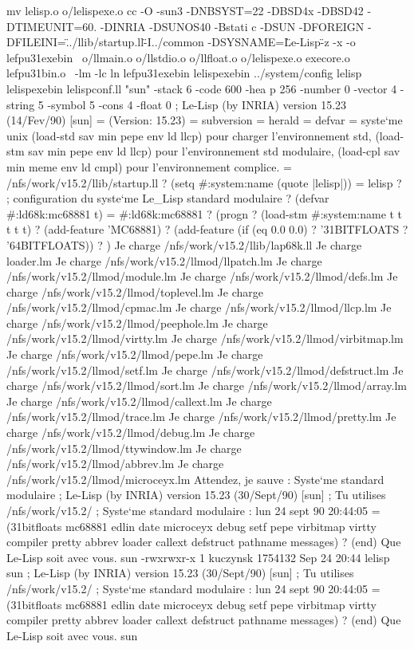 mv lelisp.o o/lelispexe.o
cc -O -sun3 -DNBSYST=22 -DBSD4x -DBSD42 -DTIMEUNIT=60. -DINRIA -DSUNOS40 -Bstati
c  -DSUN    -DFOREIGN  -DFILEINI=\"../llib/startup.ll\" -I../common -DSYSNAME=\"
Le-Lisp\" -z -x -o lefpu31exebin \
o/llmain.o o/llstdio.o o/llfloat.o  o/lelispexe.o execore.o  lefpu31bin.o \
-lm -lc
ln lefpu31exebin lelispexebin
../system/config lelisp lelispexebin lelispconf.ll "sun" -stack 6 -code 600 -hea
p 256 -number 0  -vector 4 -string 5 -symbol 5 -cons 4 -float 0
; Le-Lisp (by INRIA) version 15.23  (14/Fev/90)  [sun]
= (Version:  15.23)
= subversion
= herald
= defvar
= syste`me unix
 (load-std sav min pepe env ld llcp)  pour charger l'environnement std,
 (load-stm sav min pepe env ld llcp)  pour l'environnement std modulaire,
 (load-cpl sav min meme env ld cmpl)  pour l'environnement complice.
= /nfs/work/v15.2/llib/startup.ll
? (setq #:system:name (quote |lelisp|))
= lelisp
? ; configuration du syste`me Le_Lisp standard modulaire
? (defvar #:ld68k:mc68881 t)
= #:ld68k:mc68881
? (progn
?   (load-stm #:system:name t t t t t)
?   (add-feature 'MC68881)
?   (add-feature (if (eq 0.0 0.0)
?                  '31BITFLOATS
?                  '64BITFLOATS))
?   )
Je charge /nfs/work/v15.2/llib/lap68k.ll
Je charge loader.lm
Je charge /nfs/work/v15.2/llmod/llpatch.lm
Je charge /nfs/work/v15.2/llmod/module.lm
Je charge /nfs/work/v15.2/llmod/defs.lm
Je charge /nfs/work/v15.2/llmod/toplevel.lm
Je charge /nfs/work/v15.2/llmod/cpmac.lm
Je charge /nfs/work/v15.2/llmod/llcp.lm
Je charge /nfs/work/v15.2/llmod/peephole.lm
Je charge /nfs/work/v15.2/llmod/virtty.lm
Je charge /nfs/work/v15.2/llmod/virbitmap.lm
Je charge /nfs/work/v15.2/llmod/pepe.lm
Je charge /nfs/work/v15.2/llmod/setf.lm
Je charge /nfs/work/v15.2/llmod/defstruct.lm
Je charge /nfs/work/v15.2/llmod/sort.lm
Je charge /nfs/work/v15.2/llmod/array.lm
Je charge /nfs/work/v15.2/llmod/callext.lm
Je charge /nfs/work/v15.2/llmod/trace.lm
Je charge /nfs/work/v15.2/llmod/pretty.lm
Je charge /nfs/work/v15.2/llmod/debug.lm
Je charge /nfs/work/v15.2/llmod/ttywindow.lm
Je charge /nfs/work/v15.2/llmod/abbrev.lm
Je charge /nfs/work/v15.2/llmod/microceyx.lm
Attendez, je sauve : Syste`me standard modulaire
; Le-Lisp (by INRIA) version 15.23 (30/Sept/90)   [sun]
; Tu utilises /nfs/work/v15.2/
; Syste`me standard modulaire : lun 24 sept 90 20:44:05
= (31bitfloats mc68881 edlin date microceyx debug setf pepe virbitmap virtty
compiler pretty abbrev loader callext defstruct pathname messages)
? (end)
Que Le-Lisp soit avec vous.
sun%
-rwxrwxr-x  1 kuczynsk 1754132 Sep 24 20:44 lelisp
sun%
; Le-Lisp (by INRIA) version 15.23 (30/Sept/90)   [sun]
; Tu utilises /nfs/work/v15.2/
; Syste`me standard modulaire : lun 24 sept 90 20:44:05
= (31bitfloats mc68881 edlin date microceyx debug setf pepe virbitmap virtty
compiler pretty abbrev loader callext defstruct pathname messages)
? (end)
Que Le-Lisp soit avec vous.
sun%
\EndLL

